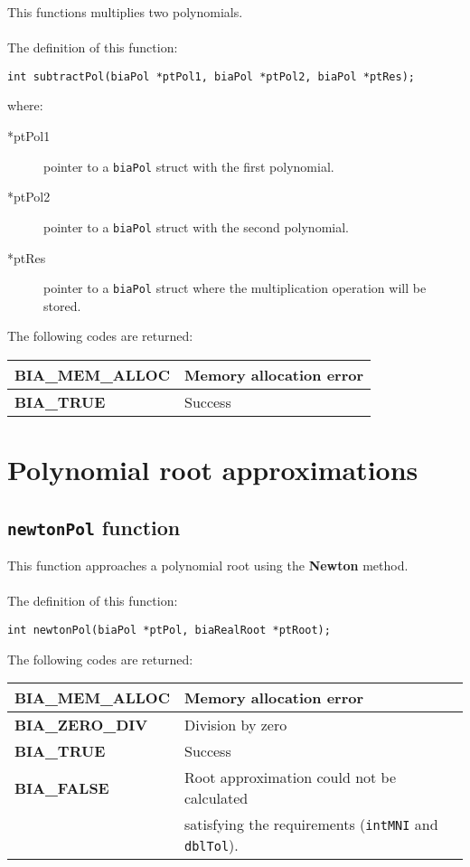 This functions multiplies two polynomials.\\ \\
%
The definition of this function:
%
\begin{verbatim}
int subtractPol(biaPol *ptPol1, biaPol *ptPol2, biaPol *ptRes);
\end{verbatim}
%
where:
%
\begin{description}
\item[*ptPol1] pointer to a \texttt{biaPol} struct with the first polynomial.
\item[*ptPol2] pointer to a \texttt{biaPol} struct with the second polynomial.
\item[*ptRes] pointer to a \texttt{biaPol} struct where the multiplication operation will be stored.
\end{description}
%
The following codes are returned:
%
\begin{center}
\begin{tabular}{|l|l|}
\hline
\textbf{BIA\_MEM\_ALLOC} & Memory allocation error \\
\hline
\textbf{BIA\_TRUE} & Success \\
\hline
\end{tabular}
\end{center}
%
%

\section{Polynomial root approximations}

\subsection{\texttt{newtonPol} function}

This function approaches a polynomial root using the \textbf{Newton} method.\\ \\
%
The definition of this function:
%
\begin{verbatim}
int newtonPol(biaPol *ptPol, biaRealRoot *ptRoot);  
\end{verbatim}
%
The following codes are returned:
%
\begin{center}
\begin{tabular}{|l|l|}
\hline
\textbf{BIA\_MEM\_ALLOC} & Memory allocation error \\
\hline
\textbf{BIA\_ZERO\_DIV} & Division by zero \\
\hline
\textbf{BIA\_TRUE} & Success \\
\hline
\textbf{BIA\_FALSE} & Root approximation could not be calculated \\
                    & satisfying the requirements (\texttt{intMNI} and \texttt{dblTol}). \\
\hline
\end{tabular}
\end{center}

